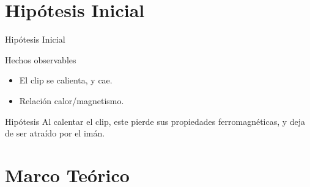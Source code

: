 \documentclass[10pt]{beamer}
\begin{document}
\section{\textrm{Hipótesis Inicial}}
    \begin{frame}{\textrm{Hipótesis Inicial}}
        \begin{block}{Hechos observables}
            \begin{itemize}
                \item El clip se calienta, y cae. 
                \item Relación calor/magnetismo. 
            \end{itemize}
        \end{block}
        \begin{block}{Hipótesis}
            Al calentar el clip, este pierde sus propiedades ferromagnéticas, y deja de ser atraído por el imán.
        \end{block}
    \end{frame}
\section{\textrm{Marco Teórico}}
\end{document}
